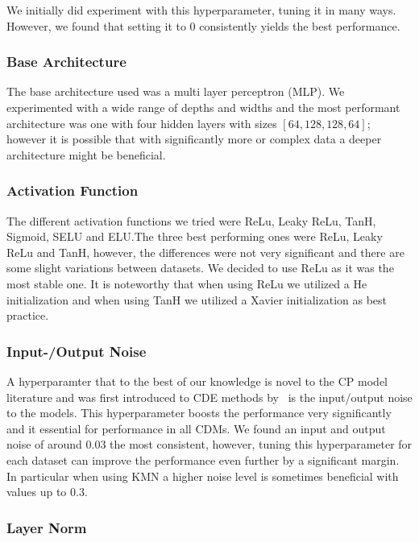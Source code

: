 We initially did experiment with this hyperparameter, tuning it in many ways. However, we found that setting it to $0$ consistently yields the best performance.

\subsubsection{Base Architecture}\label{sec:base_architecture}

The base architecture used was a multi layer perceptron (MLP). We experimented with a wide range of depths and widths and the most performant architecture was one with four hidden layers with sizes $[64, 128, 128, 64]$; however it is possible that with significantly more or complex data a deeper architecture might be beneficial.

\subsubsection{Activation Function}

The different activation functions we tried were ReLu, Leaky ReLu, TanH, Sigmoid, SELU and ELU.\@ The three best performing ones were ReLu, Leaky ReLu and TanH, however, the differences were not very significant and there are some slight variations between datasets. We decided to use ReLu as it was the most stable one. It is noteworthy that when using ReLu we utilized a He initialization and when using TanH we utilized a Xavier initialization as best practice.

\subsubsection{Input-/Output Noise}

A hyperparamter that to the best of our knowledge is novel to the CP model literature and was first introduced to CDE methods by~\cite{rothfuss2019noise} is the input/output noise to the models. This hyperparameter boosts the performance very significantly and it essential for performance in all CDMs. We found an input and output noise of around $0.03$ the most consistent, however, tuning this hyperparameter for each dataset can improve the performance even further by a significant margin. In particular when using KMN a higher noise level is sometimes beneficial with values up to $0.3$.

\subsubsection{Layer Norm}

